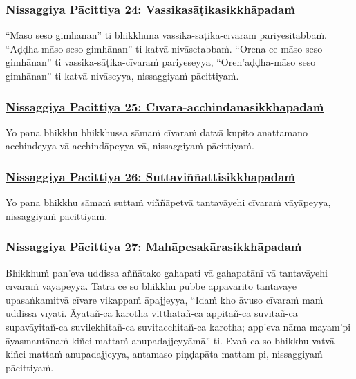 \subsubsection*{\hyperref[forf-exp24]{Nissaggiya Pācittiya 24: Vassikasāṭikasikkhāpadaṁ}}
\label{np24}

“Māso seso gimhānan” ti bhikkhunā vassika-sāṭika-cīvaraṁ pariyesitabbaṁ. “Aḍḍha-māso seso gimhānan” ti katvā nivāsetabbaṁ. “Orena ce māso seso gimhānan” ti vassika-sāṭika-cīvaraṁ pariyeseyya, “Oren’aḍḍha-māso seso gimhānan” ti katvā nivāseyya, nissaggiyaṁ pācittiyaṁ.

\subsubsection*{\hyperref[forf-exp25]{Nissaggiya Pācittiya 25: Cīvara-acchindanasikkhāpadaṁ}}
\label{np25}

Yo pana bhikkhu bhikkhussa sāmaṁ cīvaraṁ datvā kupito anattamano acchindeyya vā acchindāpeyya vā, nissaggiyaṁ pācittiyaṁ.

\subsubsection*{\hyperref[forf-exp26]{Nissaggiya Pācittiya 26: Suttaviññattisikkhāpadaṁ}}
\label{np26}

Yo pana bhikkhu sāmaṁ suttaṁ viññāpetvā tantavāyehi cīvaraṁ vāyāpeyya, nissaggiyaṁ pācittiyaṁ.

\subsubsection*{\hyperref[forf-exp27]{Nissaggiya Pācittiya 27: Mahāpesakārasikkhāpadaṁ}}
\label{np27}

Bhikkhuṁ pan’eva uddissa aññātako gahapati vā gahapatānī vā tantavāyehi cīvaraṁ vāyāpeyya. Tatra ce so bhikkhu pubbe appavārito tantavāye upasaṅkamitvā cīvare vikappaṁ āpajjeyya, “Idaṁ kho āvuso cīvaraṁ maṁ uddissa vīyati. Āyatañ-ca karotha vitthatañ-ca appitañ-ca suvītañ-ca supavāyitañ-ca suvilekhitañ-ca suvitacchitañ-ca karotha; app’eva nāma mayam'pi āyasmantānaṁ kiñci-mattaṁ anupadajjeyyāmā” ti. Evañ-ca so bhikkhu vatvā kiñci-mattaṁ anupadajjeyya, antamaso piṇḍapāta-mattam-pi, nissaggiyaṁ pācittiyaṁ.


